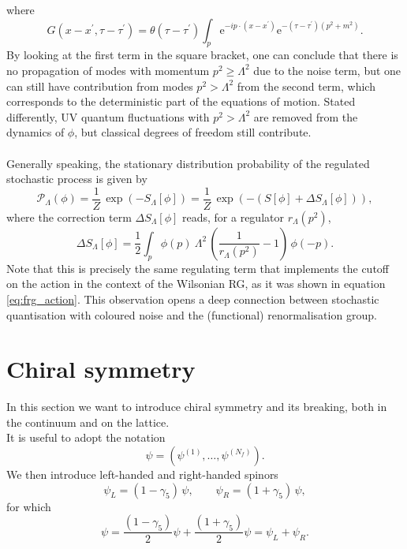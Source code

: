 where
\begin{equation*}
    G\left(x-x^{\prime}, \tau-\tau^{\prime}\right) =\theta\left(\tau-\tau^{\prime}\right) \int_p \mathrm{e}^{-i p \cdot\left(x-x^{\prime}\right)} \mathrm{e}^{-\left(\tau-\tau^{\prime}\right)\left(p^2+m^2\right)}.
\end{equation*}
By looking at the first term in the square bracket, one can conclude that there is no propagation of modes with momentum $p^2\geq \Lambda^2$ due to the noise term, but one can still have contribution from modes $p^2 > \Lambda^2$ from the second term, which corresponds to the deterministic part of the equations of motion. Stated differently, UV quantum fluctuations with $p^2 > \Lambda^2$ are removed from the dynamics of $\phi$, but classical degrees of freedom still contribute. \\~\\
Generally speaking, the stationary distribution probability of the regulated stochastic process is given by \cite{Pawlowski2017CoolingNoise}
\begin{equation}
    \mathcal{P}_\Lambda(\phi) = \frac{1}{Z} \, \exp\left(-S_\Lambda[\phi]\right) = \frac{1}{Z} \, \exp\left(-(S[\phi] + \Delta S_\Lambda[\phi])\right),
    \label{eq:probability_field_configuration_regularised}
\end{equation}
where the correction term $\Delta S_\Lambda[\phi]$ reads, for a regulator $r_\Lambda(p^2)$,
\begin{equation*}
        \Delta S_{\Lambda}[\phi]=\frac{1}{2} \int_p \phi(p) \ \Lambda^2 \, \left(\frac{1}{r_{\Lambda}\left(p^2\right)}-1\right) \, \phi(-p).
\end{equation*}
Note that this is precisely the same regulating term that implements the cutoff on the action in the context of the Wilsonian RG, as it was shown in equation \eqref{eq:frg_action}. This observation opens a deep connection 
between stochastic quantisation with coloured noise and the (functional) renormalisation group.
\section{Chiral symmetry}
\label{sec:chiral_symmetry}
In this section we want to introduce chiral symmetry and its breaking, both in the continuum and on the lattice. \\
It is useful to adopt the notation 
\begin{equation*}
    \psi = (\psi^{(1)}, \dots, \psi^{(N_f)}).
\end{equation*} 
We then introduce left-handed and right-handed spinors
\begin{equation*}
	\psi_L = (1-\gamma_5) \, \psi, \qquad \psi_R = (1+\gamma_5) \, \psi,
\end{equation*}
for which
\begin{equation*}
	\psi = \frac{(1-\gamma_5)}{2} \psi + \frac{(1+\gamma_5)}{2} \psi = \psi_L + \psi_R.
\end{equation*}


